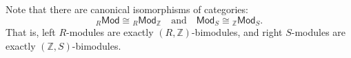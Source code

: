 \begin{definition}
    Note that there are canonical isomorphisms of categories:
    \[
        {}_R\mathsf{Mod} \cong {}_R\mathsf{Mod}_{\mathbb{Z}} \quad \text{and} \quad \mathsf{Mod}_S \cong {}_{\mathbb{Z}}\mathsf{Mod}_S.
    \]
    That is, left $R$-modules are exactly $(R, \mathbb{Z})$-bimodules, and right $S$-modules are exactly $(\mathbb{Z}, S)$-bimodules.
\end{definition}